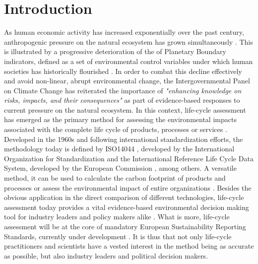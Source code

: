 \documentclass{article}
\begin{document}
\section{Introduction}
\label{sec:introduction}
    
    As human economic activity has increased exponentially over the past century, anthropogenic pressure on the natural ecosystem has grown simultaneously \cite{steffen_anthropocene_2007}. This is illustrated by a progressive deterioration of the of Planetary Boundary indicators, defined as a set of environmental control variables under which human societies has historically flourished \cite{rockstrom_planetary_2009}\cite{steffen_planetary_2015}. In order to combat this decline effectively and avoid non-linear, abrupt environmental change, the Intergovernmental Panel on Climate Change has reiterated the importance of 
    \textit{"enhancing knowledge on risks, impacts, and their consequences"} \cite{rama_climate_2022} as part of evidence-based responses to current pressure on the natural ecosystem. In this context, life-cycle assessment has emerged as the primary method for assessing the environmental impacts associated with the complete life cycle of products, processes or services \cite{hauschild_life_2018}. Developed in the 1960s and following international standardization efforts, the methodology today is defined by ISO14044 \cite{noauthor_iso_2006}, developed by the International Organization for Standardization and the International Reference Life Cycle Data System, developed by the European Commission \cite{european_commission_joint_research_centre_institute_for_environment_and_sustainability_ildc_2010}, among others. A versatile method, it can be used to calculate the carbon footprint of products and processes \cite{finkbeiner_carbon_2016} or assess the environmental impact of entire organizations \cite{finkbeiner_life_2016}. Besides the obvious application in the direct comparison of different technologies, life-cycle assessment today provides a vital evidence-based environmental decision making tool for industry leaders and policy makers alike \cite{tillman_significance_2000}\cite{seidel_application_2016}\cite{dong_environmental_2018}. What is more, life-cycle assessment will be at the core of mandatory European Sustainability Reporting Standards, currently under development \cite{noauthor_public_2022}. It is thus that not only life-cycle practitioners and scientists have a vested interest in the method being as accurate as possible, but also industry leaders and political decision makers. 
    
\end{document}
